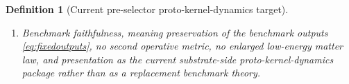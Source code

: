 \documentclass[11pt]{article}
\newcommand{\YoctoSelectorBody}[1]{\mathcal B_{#1}^{\mathrm{yoc,sel}}}
\newcommand{\YoctoSelectorShell}[1]{\mathcal Z_{#1}^{\mathrm{yoc,sel}}}
\newcommand{\PreSectionSelectorProj}[1]{\Pi_{#1}^{\mathrm{presel,sel}}}
\newcommand{\KernelProj}[1]{\Lambda_{#1}^{\mathrm{presel,ker}}}
\newcommand{\PreKernelProj}[1]{\Upsilon_{#1}^{\mathrm{presel,preker}}}
\newcommand{\ProtoKernelBody}[1]{\mathcal T_{#1}^{\mathrm{presel,proker}}}
\newcommand{\ProtoKernelProj}[1]{\Omega_{#1}^{\mathrm{presel,proker}}}
\newcommand{\ProtoKernelFunctional}[1]{\mathscr U_{#1}^{\mathrm{presel,proker}}}
\newcommand{\ProtoKernelFullFiber}[2]{\mathcal C_{#1}^{\mathrm{presel,proker}}(#2)}
\newcommand{\ProtoKernelFullMin}[1]{\mathfrak y_{#1}^{\mathrm{presel,proker}}}
\newcommand{\ProtoKernelShell}[1]{\mathcal E_{#1}^{\mathrm{presel,proker}}}
\newcommand{\InducedPreKernelShell}[1]{\widetilde{\mathcal O}_{#1}^{\mathrm{presel,preker}}}
\newtheorem{definition}{Definition}
\begin{document}
\begin{definition}[Current pre-selector proto-kernel-dynamics target]
\begin{enumerate}
    \[
    \ProtoKernelFullMin{\sigma}:\YoctoSelectorBody{\sigma}\to\ProtoKernelBody{\sigma}.
    \]
    The exact proto-kernel shell
    \[
    \ProtoKernelShell{\sigma}
    \equiv
    \left\{
    z\in\ProtoKernelBody{\sigma}:
    \PreSectionSelectorProj{\sigma}\bigl(\KernelProj{\sigma}(\PreKernelProj{\sigma}(\ProtoKernelProj{\sigma}(z)))\bigr)\in\YoctoSelectorShell{\sigma},
    \;
    \ProtoKernelFunctional{\sigma}(z)
    =
    \min_{r\in\ProtoKernelFullFiber{\sigma}{\PreSectionSelectorProj{\sigma}(\KernelProj{\sigma}(\PreKernelProj{\sigma}(\ProtoKernelProj{\sigma}(z))))}} \ProtoKernelFunctional{\sigma}(r)
    \right\}
    \]
    is required to be a closed embedded submanifold, and
    \[
    \ProtoKernelProj{\sigma}\big|_{\ProtoKernelShell{\sigma}}
    :
    \ProtoKernelShell{\sigma}\xrightarrow{\cong}\InducedPreKernelShell{\sigma}
    \]
    is required to be a diffeomorphism.
    \item Benchmark faithfulness, meaning preservation of the benchmark outputs \eqref{eq:fixedoutputs}, no second operative metric, no enlarged low-energy matter law, and presentation as the current substrate-side proto-kernel-dynamics package rather than as a replacement benchmark theory.
\end{enumerate}
\end{definition}
\end{document}
